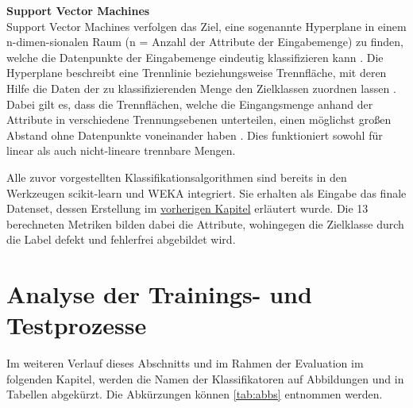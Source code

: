 \textbf{Support Vector Machines\medskip}\\
Support Vector Machines verfolgen das Ziel, eine sogenannte \glqq Hyperplane\grqq{} in einem n-dimen-sionalen Raum (n = Anzahl der Attribute der Eingabemenge) zu finden, welche die Datenpunkte der Eingabemenge eindeutig klassifizieren kann \cite{Gandhi2018}. Die Hyperplane beschreibt eine Trennlinie beziehungsweise Trennfläche, mit deren Hilfe die Daten der zu klassifizierenden Menge den Zielklassen zuordnen lassen \cite{Luber2019}. Dabei gilt es, dass die Trennflächen, welche die Eingangsmenge anhand der Attribute in verschiedene Trennungsebenen unterteilen, einen möglichst großen Abstand ohne Datenpunkte voneinander haben \cite{Luber2019}. Dies funktioniert sowohl für linear als auch nicht-lineare trennbare Mengen.

Alle zuvor vorgestellten Klassifikationsalgorithmen sind bereits in den Werkzeugen scikit-learn und WEKA integriert. Sie erhalten als Eingabe das finale Datenset, dessen Erstellung im \hyperref[dataset]{vorherigen Kapitel} erläutert wurde. Die 13 berechneten Metriken bilden dabei die Attribute, wohingegen die Zielklasse durch die Label \glqq defekt\grqq{} und \glqq fehlerfrei\grqq{} abgebildet wird.


\section{Analyse der Trainings- und Testprozesse}

Im weiteren Verlauf dieses Abschnitts und im Rahmen der Evaluation im folgenden Kapitel, werden die Namen der Klassifikatoren auf Abbildungen und in Tabellen abgekürzt. Die Abkürzungen können \autoref{tab:abbs} entnommen werden.

